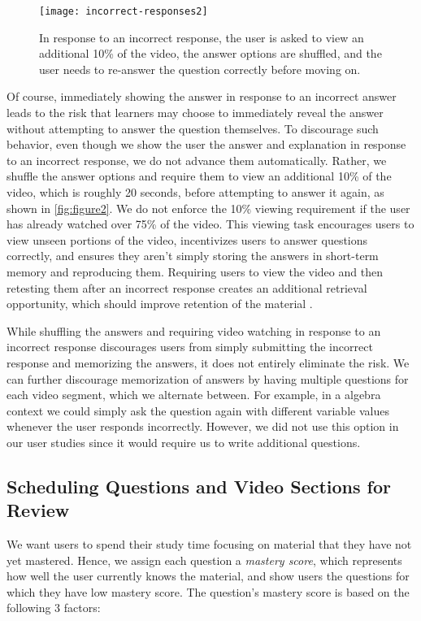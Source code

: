 \documentclass{chi-ext}
\begin{document}
\begin{figure}
\centering
\texttt{[image: incorrect-responses2]}
\caption{In response to an incorrect response, the user is asked to view an additional 10\% of the video, the answer options are shuffled, and the user needs to re-answer the question correctly before moving on.}
\label{fig:figure2}
\end{figure}

Of course, immediately showing the answer in response to an incorrect answer leads to the risk that learners may choose to immediately reveal the answer without attempting to answer the question themselves. To discourage such behavior, even though we show the user the answer and explanation in response to an incorrect response, we do not advance them automatically. Rather, we shuffle the answer options and require them to view an additional 10\% of the video, which is roughly 20 seconds, before attempting to answer it again, as shown in \autoref{fig:figure2}. We do not enforce the 10\% viewing requirement if the user has already watched over 75\% of the video. This viewing task encourages users to view unseen portions of the video, incentivizes users to answer questions correctly, and ensures they aren't simply storing the answers in short-term memory and reproducing them. Requiring users to view the video and then retesting them after an incorrect response creates an additional retrieval opportunity, which should improve retention of the material \cite{testingeffect}.

While shuffling the answers and requiring video watching in response to an incorrect response discourages users from simply submitting the incorrect response and memorizing the answers, it does not entirely eliminate the risk. We can further discourage memorization of answers by having multiple questions for each video segment, which we alternate between. For example, in a algebra context we could simply ask the question again with different variable values whenever the user responds incorrectly. However, we did not use this option in our user studies since it would require us to write additional questions.

\subsection{Scheduling Questions and Video Sections for Review}

We want users to spend their study time focusing on material that they have not yet mastered. Hence, we assign each question a \emph{mastery score}, which represents how well the user currently knows the material, and show users the questions for which they have low mastery score. The question's mastery score is based on the following 3 factors:
\end{document}
